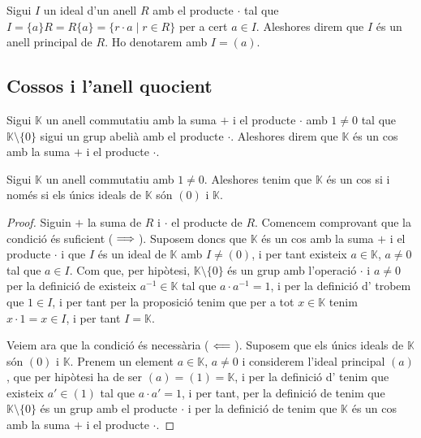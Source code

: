 \documentclass[../Apunts.tex]{subfiles}
\begin{document}
	\begin{definition}
		\label{def:ideal principal}
		Sigui \(I\) un ideal d'un anell \(R\) amb el producte \(\cdot\) tal que \(I=\{a\}R=R\{a\}=\{r\cdot a\mid r\in R\}\) per a cert \(a\in I\). Aleshores direm que \(I\) és un anell principal de \(R\). Ho denotarem amb \(I=(a)\).
	\end{definition}
	\subsection{Cossos i l'anell quocient}
	\begin{definition}[Cos] %
		\label{def:cos per anells}
		Sigui \(\mathbb{K}\) un anell commutatiu amb la suma \(+\) i el producte \(\cdot\) amb \(1\neq0\) tal que \(\mathbb{K}\setminus\{0\}\) sigui un grup abelià amb el producte \(\cdot\). Aleshores direm que \(\mathbb{K}\) és un cos amb la suma \(+\) i el producte \(\cdot\).
	\end{definition}
	\begin{proposition}
		\label{prop:condició equivalent a cos per anells}
		Sigui \(\mathbb{K}\) un anell commutatiu amb \(1\neq0\). Aleshores tenim que \(\mathbb{K}\) és un cos si i només si els únics ideals de \(\mathbb{K}\) són \((0)\) i \(\mathbb{K}\).
		\begin{proof}
			Siguin \(+\) la suma de \(R\) i \(\cdot\) el producte de \(R\). Comencem comprovant que la condició és suficient (\(\implies\)). Suposem doncs que \(\mathbb{K}\) és un cos amb la suma \(+\) i el producte \(\cdot\) i que \(I\) és un ideal de \(\mathbb{K}\) amb \(I\neq(0)\), i per tant existeix \(a\in\mathbb{K}\), \(a\neq0\) tal que \(a\in I\). Com que, per hipòtesi, \(\mathbb{K}\setminus\{0\}\) és un grup amb l'operació \(\cdot\) i \(a\ne0\) per la definició de  existeix \(a^{-1}\in\mathbb{K}\) tal que \(a\cdot a^{-1}=1\), i per la definició d' trobem que \(1\in I\), i per tant per la proposició  tenim que per a tot \(x\in\mathbb{K}\) tenim \(x\cdot1=x\in I\), i per tant \(I=\mathbb{K}\).
			
			Veiem ara que la condició és necessària (\(\impliedby\)). Suposem que els únics ideals de \(\mathbb{K}\) són \((0)\) i \(\mathbb{K}\). Prenem un element \(a\in\mathbb{K}\), \(a\neq0\) i considerem l'ideal principal \((a)\), que per hipòtesi ha de ser \((a)=(1)=\mathbb{K}\), i per la definició d' tenim que existeix \(a'\in(1)\) tal que \(a\cdot a'=1\), i per tant, per la definició de  tenim que \(\mathbb{K}\setminus\{0\}\) és un grup amb el producte \(\cdot\) i per la definició de  tenim que \(\mathbb{K}\) és un cos amb la suma \(+\) i el producte \(\cdot\).
		\end{proof}
	\end{proposition}
\end{document}
